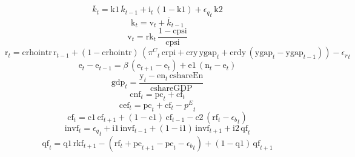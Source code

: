 \begin{dmath}
{{\bar{k}}}_{t}={{\mathrm{k1}}}\, {{\bar{k}}}_{t-1}+{{\mathrm{i}}}_{t}\, \left(1-{{\mathrm{k1}}}\right)+{{\epsilon_{q}}}_{t}\, {{\mathrm{k2}}}
\end{dmath}
\begin{dmath}
{{\mathrm{k}}}_{t}={{\mathrm{v}}}_{t}+{{\bar{k}}}_{t-1}
\end{dmath}
\begin{dmath}
{{\mathrm{v}}}_{t}={{\mathrm{rk}}}_{t}\, \frac{1-{{\mathrm{cpsi}}}}{{{\mathrm{cpsi}}}}
\end{dmath}
\begin{dmath}
{{\mathrm{r}}}_{t}={{\mathrm{crhointr}}}\, {{\mathrm{r}}}_{t-1}+\left(1-{{\mathrm{crhointr}}}\right)\, \left({{\pi^{C}}}_{t}\, {{\mathrm{crpi}}}+{{\mathrm{cry}}}\, {{\mathrm{ygap}}}_{t}+{{\mathrm{crdy}}}\, \left({{\mathrm{ygap}}}_{t}-{{\mathrm{ygap}}}_{t-1}\right)\right)-{{\epsilon_{r}}}_{t}
\end{dmath}
\begin{dmath}
{{\mathrm{e}}}_{t}-{{\mathrm{e}}}_{t-1}={{\beta}}\, \left({{\mathrm{e}}}_{t+1}-{{\mathrm{e}}}_{t}\right)+{{\mathrm{e1}}}\, \left({{\mathrm{n}}}_{t}-{{\mathrm{e}}}_{t}\right)
\end{dmath}
\begin{dmath}
{{\mathrm{gdp}}}_{t}=\frac{{{\mathrm{y}}}_{t}-{{\mathrm{en}}}_{t}\, {{\mathrm{cshareEn}}}}{{{\mathrm{cshareGDP}}}}
\end{dmath}
\begin{dmath}
{{\mathrm{cnf}}}_{t}={{\mathrm{pc}}}_{t}+{{\mathrm{cf}}}_{t}
\end{dmath}
\begin{dmath}
{{\mathrm{cef}}}_{t}={{\mathrm{pc}}}_{t}+{{\mathrm{cf}}}_{t}-{{p^{E}}}_{t}
\end{dmath}
\begin{dmath}
{{\mathrm{cf}}}_{t}={{\mathrm{c1}}}\, {{\mathrm{cf}}}_{t+1}+\left(1-{{\mathrm{c1}}}\right)\, {{\mathrm{cf}}}_{t-1}-{{\mathrm{c2}}}\, \left({{\mathrm{rf}}}_{t}-{{\epsilon_{b}}}_{t}\right)
\end{dmath}
\begin{dmath}
{{\mathrm{invf}}}_{t}={{\epsilon_{q}}}_{t}+{{\mathrm{i1}}}\, {{\mathrm{invf}}}_{t-1}+\left(1-{{\mathrm{i1}}}\right)\, {{\mathrm{invf}}}_{t+1}+{{\mathrm{i2}}}\, {{\mathrm{qf}}}_{t}
\end{dmath}
\begin{dmath}
{{\mathrm{qf}}}_{t}={{\mathrm{q1}}}\, {{\mathrm{rkf}}}_{t+1}-\left({{\mathrm{rf}}}_{t}+{{\mathrm{pc}}}_{t+1}-{{\mathrm{pc}}}_{t}-{{\epsilon_{b}}}_{t}\right)+\left(1-{{\mathrm{q1}}}\right)\, {{\mathrm{qf}}}_{t+1}
\end{dmath}
